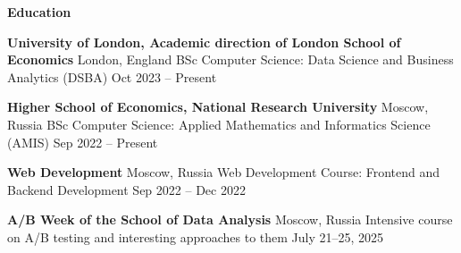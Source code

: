 \begin{center}
    \textbf{Education}
\end{center}

\textbf{University of London, Academic direction of London School of Economics} \hfill London, England
BSc Computer Science: Data Science and Business Analytics (DSBA) \hfill Oct 2023 – Present

\textbf{Higher School of Economics, National Research University} \hfill Moscow, Russia
BSc Computer Science: Applied Mathematics and Informatics Science (AMIS) \hfill Sep 2022 – Present

\textbf{Web Development} \hfill Moscow, Russia
Web Development Course: Frontend and Backend Development \hfill Sep 2022 – Dec 2022

\textbf{A/B Week of the School of Data Analysis} \hfill Moscow, Russia
Intensive course on A/B testing and interesting approaches to them \hfill July 21–25, 2025